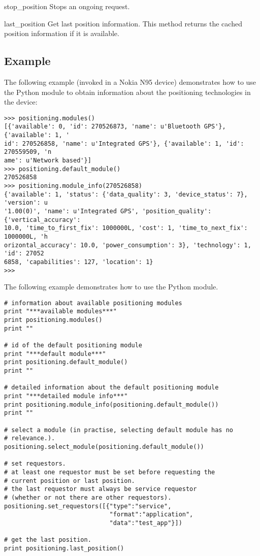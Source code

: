 \begin{funcdesc}{stop_position}{}
Stops an ongoing  request.
\end{funcdesc}

\begin{funcdesc}{last_position}{}
Get last position information. 
This method returns the cached position information if it is available.
\end{funcdesc}

\subsection{Example \label{position-example}}

The following example (invoked in a Nokia N95 device) demonstrates how to use 
the Python  module to obtain information about the 
positioning technologies in the device:

\begin{verbatim}
>>> positioning.modules()
[{'available': 0, 'id': 270526873, 'name': u'Bluetooth GPS'}, {'available': 1, '
id': 270526858, 'name': u'Integrated GPS'}, {'available': 1, 'id': 270559509, 'n
ame': u'Network based'}]
>>> positioning.default_module()
270526858
>>> positioning.module_info(270526858)
{'available': 1, 'status': {'data_quality': 3, 'device_status': 7}, 'version': u
'1.00(0)', 'name': u'Integrated GPS', 'position_quality': {'vertical_accuracy':
10.0, 'time_to_first_fix': 1000000L, 'cost': 1, 'time_to_next_fix': 1000000L, 'h
orizontal_accuracy': 10.0, 'power_consumption': 3}, 'technology': 1, 'id': 27052
6858, 'capabilities': 127, 'location': 1}
>>>
\end{verbatim}

The following example demonstrates how to use the Python  
module.

\begin{verbatim}
# information about available positioning modules
print "***available modules***"
print positioning.modules()
print ""

# id of the default positioning module
print "***default module***"
print positioning.default_module()
print ""

# detailed information about the default positioning module
print "***detailed module info***"
print positioning.module_info(positioning.default_module())
print ""

# select a module (in practise, selecting default module has no 
# relevance.). 
positioning.select_module(positioning.default_module())

# set requestors.
# at least one requestor must be set before requesting the 
# current position or last position.
# the last requestor must always be service requestor 
# (whether or not there are other requestors). 
positioning.set_requestors([{"type":"service",
                             "format":"application",
                             "data":"test_app"}])
                            
# get the last position.
print positioning.last_position()
\end{verbatim}

